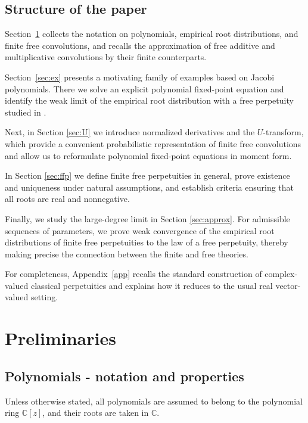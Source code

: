 \documentclass[a4paper,11pt]{amsart}
\numberwithin{equation}{section}
\newcommand{\C}{\mathbb{C}}
\begin{document}
\subsection*{Structure of the paper}

Section~\ref{sec:preli} collects the notation on polynomials, empirical root distributions, and finite free convolutions, and recalls the approximation of free additive and multiplicative convolutions by their finite counterparts.

Section~\ref{sec:ex} presents a motivating family of examples based on Jacobi polynomials.
There we solve an explicit polynomial fixed-point equation and identify the weak limit of the empirical root distribution with a free perpetuity studied in \cite{FreePerp}.

Next, in Section \ref{sec:U} we introduce normalized derivatives and the \(U\)-transform, which provide a convenient probabilistic representation of finite free convolutions and allow us to reformulate polynomial fixed-point equations in moment form.

In Section \ref{sec:ffp} we define finite free perpetuities in general, prove existence and uniqueness under natural assumptions, and establish criteria ensuring that all roots are real and nonnegative.

Finally, we study the large-degree limit in Section \ref{sec:approx}.
For admissible sequences of parameters, we prove weak convergence of the empirical root distributions of finite free perpetuities to the law of a free perpetuity, thereby making precise the connection between the finite and free theories.

For completeness, Appendix~\ref{app} recalls the standard construction of complex-valued classical perpetuities and explains how it reduces to the usual real vector-valued setting.

\section{Preliminaries}\label{sec:preli}



\subsection{Polynomials - notation and properties}


Unless otherwise stated, all polynomials are assumed to belong to the polynomial ring $\C[z]$, and their roots are taken in $\C$.
\end{document}
